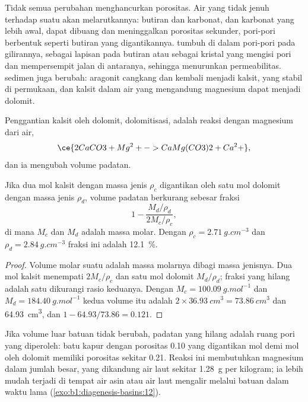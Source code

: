 Tidak semua perubahan menghancurkan porositas. Air yang tidak jenuh terhadap suatu  akan melarutkannya: butiran  dan karbonat, dan  karbonat yang lebih awal, dapat dibuang dan meninggalkan porositas sekunder, pori-pori berbentuk seperti butiran yang digantikannya.  tumbuh di dalam pori-pori pada gilirannya, sebagai lapisan pada butiran atau sebagai kristal yang mengisi pori dan mempersempit jalan di antaranya, sehingga menurunkan permeabilitas.  sedimen juga berubah: aragonit cangkang dan  kembali menjadi kalsit, yang stabil di permukaan, dan kalsit dalam air yang mengandung magnesium dapat menjadi dolomit.

Penggantian kalsit oleh dolomit, dolomitisasi, adalah reaksi dengan magnesium dari air,
\[
  \ce{2 CaCO3 + Mg^2+ -> CaMg(CO3)2 + Ca^2+},
\]
dan ia mengubah volume padatan.

\begin{proposition}\label{prop:b1:diagenesis-basins:dolomite}
Jika dua mol kalsit dengan massa jenis $\rho_c$ digantikan oleh satu mol dolomit dengan massa jenis $\rho_d$, volume padatan berkurang sebesar fraksi
\[
  1 - \frac{M_d/\rho_d}{2M_c/\rho_c},
\]
di mana $M_c$ dan $M_d$ adalah massa molar. Dengan $\rho_c = \qty{2.71}{g.cm^{-3}}$ dan $\rho_d = \qty{2.84}{g.cm^{-3}}$ fraksi ini adalah \qty{12.1}{\percent}.
\end{proposition}

\begin{proof}
Volume molar suatu  adalah massa molarnya dibagi massa jenisnya. Dua mol kalsit menempati $2M_c/\rho_c$ dan satu mol dolomit $M_d/\rho_d$; fraksi yang hilang adalah satu dikurangi rasio keduanya. Dengan $M_c = \qty{100.09}{g.mol^{-1}}$ dan $M_d = \qty{184.40}{g.mol^{-1}}$ kedua volume itu adalah
$2\times\qty{36.93}{cm^3} = \qty{73.86}{cm^3}$ dan \qty{64.93}{cm^3}, dan $1 - 64.93/73.86 = \num{0.121}$.
\end{proof}

Jika volume luar batuan tidak berubah, padatan yang hilang adalah ruang pori yang diperoleh: batu kapur dengan porositas \num{0.10} yang digantikan mol demi mol oleh dolomit memiliki porositas sekitar \num{0.21}. Reaksi ini membutuhkan magnesium dalam jumlah besar, yang dikandung air laut sekitar \qty{1.28}{g} per kilogram; ia lebih mudah terjadi di tempat air asin atau air laut mengalir melalui batuan dalam waktu lama (\cref{exo:b1:diagenesis-basins:12}).

